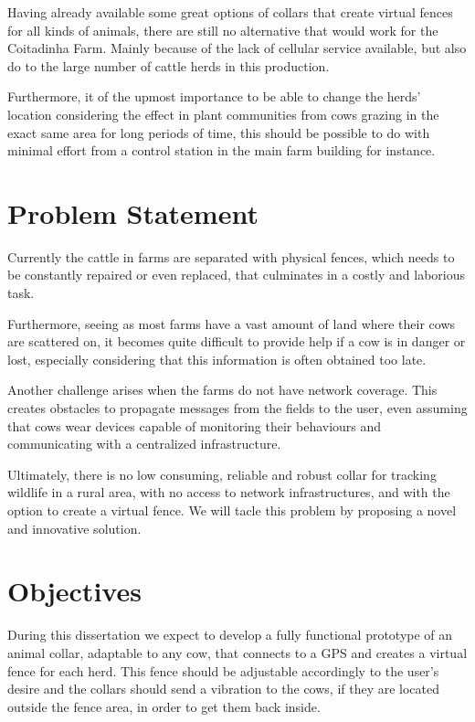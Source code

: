 Having already available some great options of collars that create virtual fences for all
kinds of animals, there are still no alternative that would work for the Coitadinha Farm.
Mainly because of the lack of cellular service available, but also do to the large number
of cattle herds in this production.

Furthermore, it of the upmost importance to be able to change the herds' location considering
the effect in plant communities from cows grazing in the exact same area for long periods
of time, this should be possible to do with minimal effort from a control station in the main
farm building for instance.


\section{Problem Statement}
\label{sec:problem_statement}
Currently the cattle in farms are separated with physical fences, which needs to be constantly
repaired or even replaced, that culminates in a costly and laborious task.

Furthermore, seeing as most farms have a vast amount of land where their cows are scattered on,
it becomes quite difficult to provide help if a cow is in danger or lost, especially considering
that this information is often obtained too late.

Another challenge arises when the farms do not have network coverage. This creates obstacles
to propagate messages from the fields to the user, even assuming that cows wear devices
capable of monitoring their behaviours and communicating with a centralized infrastructure.

Ultimately, there is no low consuming, reliable and robust collar for tracking wildlife in a
rural area, with no access to network infrastructures, and with the option to create a virtual
fence. We will tacle this problem by proposing a novel and innovative solution.

\section{Objectives}
\label{sec:objectives}
During this dissertation we expect to develop a fully functional prototype of an animal collar,
adaptable to any cow, that connects to a \Gls{GPS} and creates a virtual fence for each herd. This
fence should be adjustable accordingly to the user's desire and the collars should send a
vibration to the cows, if they are located outside the fence area, in order to get them back
inside.

